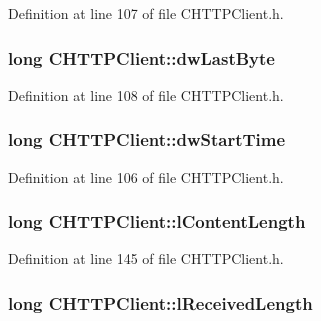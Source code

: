 \-Definition at line 107 of file \-C\-H\-T\-T\-P\-Client.\-h.

\hypertarget{class_c_h_t_t_p_client_a7461aa9373197650c49ab680e6536d22}{
\subsubsection[{dw\-Last\-Byte}]{\setlength{\rightskip}{0pt plus 5cm}long {\bf \-C\-H\-T\-T\-P\-Client\-::dw\-Last\-Byte}}}\label{class_c_h_t_t_p_client_a7461aa9373197650c49ab680e6536d22}


\-Definition at line 108 of file \-C\-H\-T\-T\-P\-Client.\-h.

\hypertarget{class_c_h_t_t_p_client_abaa4f1ce357ce53d5087281ad27c9c1b}{
\subsubsection[{dw\-Start\-Time}]{\setlength{\rightskip}{0pt plus 5cm}long {\bf \-C\-H\-T\-T\-P\-Client\-::dw\-Start\-Time}}}\label{class_c_h_t_t_p_client_abaa4f1ce357ce53d5087281ad27c9c1b}


\-Definition at line 106 of file \-C\-H\-T\-T\-P\-Client.\-h.

\hypertarget{class_c_h_t_t_p_client_a3840ab9a7468b62900613238c47c36cb}{
\subsubsection[{l\-Content\-Length}]{\setlength{\rightskip}{0pt plus 5cm}long {\bf \-C\-H\-T\-T\-P\-Client\-::l\-Content\-Length}}}\label{class_c_h_t_t_p_client_a3840ab9a7468b62900613238c47c36cb}


\-Definition at line 145 of file \-C\-H\-T\-T\-P\-Client.\-h.

\hypertarget{class_c_h_t_t_p_client_a3912e2379d3a00b9a0e671abab1dd0b7}{
\subsubsection[{l\-Received\-Length}]{\setlength{\rightskip}{0pt plus 5cm}long {\bf \-C\-H\-T\-T\-P\-Client\-::l\-Received\-Length}}}\label{class_c_h_t_t_p_client_a3912e2379d3a00b9a0e671abab1dd0b7}


